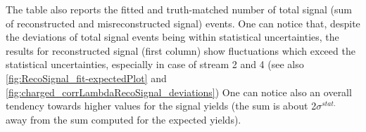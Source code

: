 \begin{table}[H]
\centering
{}%
\caption{Comparison of fitted and expected signal yields, fitted and truth-matched total signal for six streams of Belle generic MC when fitting the two dimensional distributions of $M_{bc}$ and $M(p K \pi)$.}
\label{tab:SixStreams_chargedCorrLam2Dfits}
\end{table}


\noindent  The table also reports the fitted and truth-matched number of total signal (sum of reconstructed and misreconstructed signal) events. 
One can notice that, despite the deviations of total signal events being within statistical uncertainties, the results for reconstructed signal (first column)
show fluctuations which exceed the statistical uncertainties, especially in case of stream 2 and 4 (see also \cref{fig:RecoSignal_fit-expectedPlot} and \cref{fig:charged_corrLambdaRecoSignal_deviations}) 
One can notice also an overall tendency towards higher values for the signal yields (the sum is about 2$\sigma^{stat.}$ away from the sum computed for the expected yields).%


